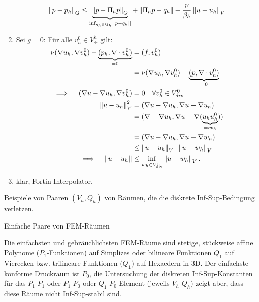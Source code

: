 \begin{beweis}
\begin{enumerate}
\begin{align*}
      \left \|p - p_{h} \right\|_{Q} \leq \underbrace{\left \|p - \Pi_{h} p \right\|_{Q}}_{\inf_{q_{h} \in Q_{h}} \left \|p - q_{h} \right\|} + \left \|\Pi_{h} p - q_{h} \right\| + \frac \nu {\beta_{h}} \left \|u - u_{h} \right\|_{V}
    \end{align*}
  \item Sei $g = 0$: Für alle $v_{h}^{0} \in V_{\div}^{h}$ gilt:
    \begin{align*}
      \nu(\nabla u_{h}, \nabla v_{h}^{0}) - \underbrace{(p_{h}, \nabla\cdot v_{h}^{0})}_{= 0} &= (f, v_{h}^{0})\\
      &= \nu(\nabla u_{h}, \nabla v_{h}^{0}) - \underbrace{(p, \nabla\cdot v_{h}^{0})}_{= 0} \\
      \implies \quad (\nabla u - \nabla u_{h}, \nabla v_{h}^{0}) &= 0\quad \forall v_{h}^{0} \in V_{div}^{0}\\
      \left \|u - u_{h} \right\|_{V}^{2} &= (\nabla u - \nabla u_{h}, \nabla u - \nabla u_{h}) \\
      &= (\nabla - \nabla u_{h}, \nabla u - \nabla(\underbrace{u_{h} u_{h}^{0}}_{\eqqcolon w_{h}})) \\
      &= (\nabla u - \nabla u_{h}, \nabla u - \nabla w_{h})\\
      &\leq \left \|u - u_{h} \right\|_{V} \cdot \left \|u - w_{h} \right\|_{V}\\
      \implies \quad \left \|u - u_{h} \right\| &\leq \inf_{w_{h} \in V_{\operatorname{div}}^{h}} \left \|u - w_{h} \right\|_{V}.
    \end{align*}
  \item klar, Fortin-Interpolator. 
  \end{enumerate}
\end{beweis}
\begin{beispiel}%
 Beispiele von Paaren $(V_{h}, Q_{h})$ von Räumen, die die diskrete Inf-Sup-Bedingung verletzen.
\end{beispiel}
\begin{bemerkung}%
  Einfache Paare von FEM-Räumen

Die einfachsten und gebräuchlichsten FEM-Räume sind stetige, stückweise affine Polynome ($P_{1}$-Funktionen) auf Simplizes oder bilineare Funktionen $Q_{1}$ auf Vierecken bzw. trilineare Funktionen ($Q_1$) auf Hexaedern in 3D. Der einfachste konforme Druckraum ist $P_{0}$, die Untersuchung der diskreten Inf-Sup-Konstanten für das $P_{1}$-$P_{1}$ oder $P_{1}$-$P_{0}$ oder $Q_{1}$-$P_{0}$-Element (jeweils $V_{h}$-$Q_{h}$) zeigt aber, dass diese Räume nicht Inf-Sup-stabil sind.  
\end{bemerkung}

